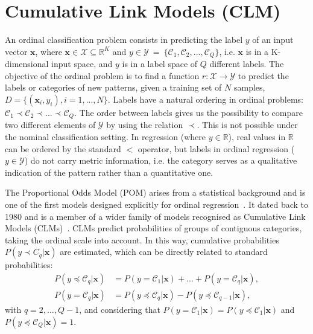 \documentclass[journal]{IEEEtran}
\begin{document}
	
	
	
	\section{Cumulative Link Models (CLM)}
	\label{sect:ordinalproblem}
	An ordinal classification problem consists in predicting the label $y$ of an input vector $\mathbf{x}$, where $\mathbf{x} \in \mathcal{X} \subseteq \mathds{R}^K$ and $y \in \mathcal{Y}~=~\{\mathcal{C}_1, \mathcal{C}_2, ..., \mathcal{C}_Q\}$, i.e. $\mathbf{x}$ is in a K-dimensional input space, and $y$ is in a label space of $Q$ different labels. The objective of the ordinal problem is to find a function $r : \mathcal{X} \rightarrow \mathcal{Y}$ to predict the labels or categories of new patterns, given a training set of $N$ samples, $D = \{(\mathbf{x}_i, y_i), i = 1, ..., N\}$. Labels have a natural ordering in ordinal problems: $\mathcal{C}_1 \prec \mathcal{C}_2 \prec ... \prec \mathcal{C}_Q$. The order between labels gives us the possibility to compare two different elements of $\mathcal{Y}$ by using the relation $\prec$. This is not possible under the nominal classification setting. In regression (where $y \in \mathds{R}$), real values in $\mathds{R}$ can be ordered by the standard $<$ operator, but labels in ordinal regression ($y \in \mathcal{Y}$) do not carry metric information, i.e. the category serves as a qualitative indication of the pattern rather than a quantitative one.
	
	The Proportional Odds Model (POM) arises from a statistical background and is one of the first models designed explicitly for ordinal regression~\cite{mccullagh1980regression}. It dated back to 1980 and is a member of a wider family of models recognised as Cumulative Link Models (CLMs)~\cite{agresti2010analysis}. CLMs predict probabilities of groups of contiguous categories, taking the ordinal scale into account. In this way, cumulative probabilities $P(y \prec C_q |\mathbf{x})$ are estimated, which can be directly related to standard probabilities:
	\begin{align}
		\nonumber P(y \preceq \mathcal{C}_q | \mathbf{x}) &= P(y = \mathcal{C}_1 | \mathbf{x}) + ... + P(y = \mathcal{C}_q | \mathbf{x}),\\
		\nonumber P(y = \mathcal{C}_q | \mathbf{x}) &= P(y \preceq \mathcal{C}_q | \mathbf{x}) - P(y \preceq \mathcal{C}_{q-1} | \mathbf{x}),
	\end{align}
	with $q = 2, ..., Q-1$, and considering that $P(y = \mathcal{C}_1 | \mathbf{x}) = P(y \preceq \mathcal{C}_1 | \mathbf{x})$ and $P(y \preceq \mathcal{C}_Q | \mathbf{x}) = 1$.
	
\end{document}
